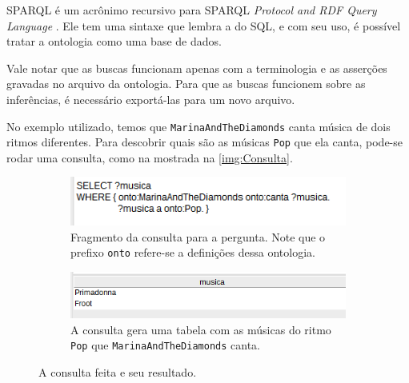 SPARQL é um acrônimo recursivo para SPARQL \textit{Protocol and RDF Query Language}  \citep{ferramentasSPARQL}. Ele tem uma sintaxe que lembra a do SQL, e com seu uso, é possível tratar a ontologia como uma base de dados.  

Vale notar que as buscas funcionam apenas com a terminologia e as asserções gravadas no arquivo da ontologia. Para que as buscas funcionem sobre as inferências, é necessário exportá-las para um novo arquivo.

No exemplo utilizado, temos que \texttt{MarinaAndTheDiamonds} canta música de dois ritmos diferentes. Para descobrir quais são as músicas \texttt{Pop} que ela canta, pode-se rodar uma consulta, como na mostrada na \autoref{img:Consulta}.

\begin{figure}[H]
	\centering
	\begin{subfigure}{.7\textwidth}
		\centering
		\includegraphics[width=0.95\linewidth]{Capitulos/Ferramentas/query}
		\caption{Fragmento da consulta para a pergunta. Note que o prefixo \texttt{onto} refere-se a definições dessa ontologia.}
	\end{subfigure}
	\begin{subfigure}{.7\textwidth}
		\centering
		\includegraphics[width=0.95\linewidth]{Capitulos/Ferramentas/resultado}
		\caption{A consulta gera uma tabela com as músicas do ritmo \texttt{Pop} que \texttt{MarinaAndTheDiamonds} canta.}
	\end{subfigure}
	\caption{A consulta feita e seu resultado.}
	\label{img:Consulta}
\end{figure}